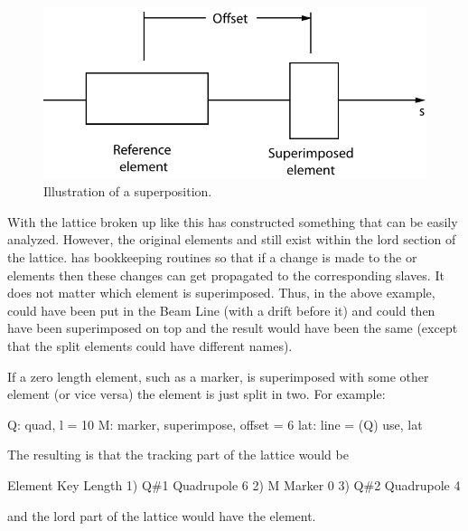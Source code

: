 \begin{figure}[tb]
\centering 
\includegraphics{superimpose.pdf} 
\caption[Superposition Illustration.]
{Illustration of a superposition.}
\label{f:superimpose}
\end{figure}

With the lattice broken up like this \bmad has constructed something
that can be easily analyzed. However, the original elements  and
 still exist within the lord section of the lattice. \bmad has
bookkeeping routines so that if a change is made to the  or
 elements then these changes can get propagated to the
corresponding slaves. It does not matter which element is
superimposed. Thus, in the above example,  could have been put
in the Beam Line (with a drift before it) and  could then have
been superimposed on top and the result would have been the same
(except that the split elements could have different names).

If a zero length element, such as a marker, is superimposed with some
other element (or vice versa) the element is just split in two. For
example:
\begin{example}
  Q: quad, l = 10
  M: marker, superimpose, offset = 6
  lat: line = (Q)
  use, lat
\end{example}
The resulting is that the tracking part of the lattice would be
\begin{example}
        Element   Key           Length
  1)    Q{\#}1       Quadrupole    6
  2)    M         Marker        0
  3)    Q{\#}2       Quadrupole    4
\end{example}
and the lord part of the lattice would have the  element.
 
